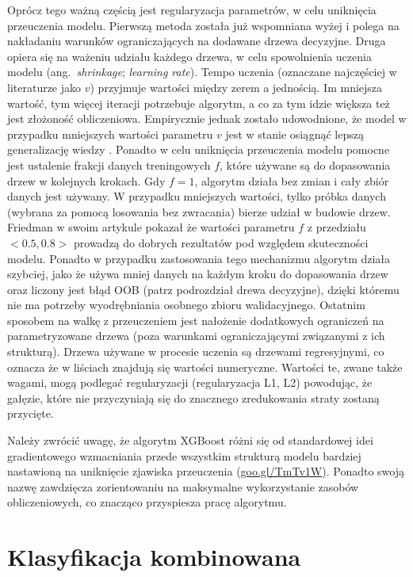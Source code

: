 \documentclass[12pt,a4paper,twoside,openany]{book}
\begin{document}
Oprócz tego ważną częścią jest regularyzacja parametrów, w celu uniknięcia przeuczenia modelu. Pierwszą metoda została już wspomniana wyżej i polega na nakładaniu warunków ograniczających na dodawane drzewa decyzyjne. Druga opiera się na ważeniu udziału każdego drzewa, w celu spowolnienia uczenia modelu (ang.~\textit{shrinkage}; \textit{learning rate}). Tempo uczenia (oznaczane najczęściej w literaturze jako $v$) przyjmuje wartości między zerem a jednością. Im mniejsza wartość, tym więcej iteracji potrzebuje algorytm, a co za tym idzie większa też jest złożoność obliczeniowa. Empirycznie jednak zostało udowodnione, że model w przypadku mniejszych wartości parametru $v$ jest w stanie osiągnąć lepszą generalizację wiedzy \citep{hastie2009}. Ponadto w celu uniknięcia przeuczenia modelu pomocne jest ustalenie frakcji danych treningowych $f$, które używane są do dopasowania drzew w kolejnych krokach. Gdy $f = 1$, algorytm działa bez zmian i cały zbiór danych jest używany. W przypadku mniejszych wartości, tylko próbka danych (wybrana za pomocą losowania bez zwracania) bierze udział w budowie drzew. Friedman w swoim artykule \citep{friedman1999} pokazał że wartości parametru $f$ z przedziału $<0.5, 0.8>$ prowadzą do dobrych rezultatów pod względem skuteczności modelu. Ponadto w przypadku zastosowania tego mechanizmu algorytm działa szybciej, jako że używa mniej danych na każdym kroku do dopasowania drzew oraz liczony jest błąd OOB (patrz podrozdział drewa decyzyjne), dzięki któremu nie ma potrzeby wyodrębniania osobnego zbioru walidacyjnego. Ostatnim sposobem na walkę z przeuczeniem jest nałożenie dodatkowych ograniczeń na parametryzowane drzewa (poza warunkami ograniczającymi związanymi z ich strukturą). Drzewa używane w procesie uczenia są drzewami regresyjnymi, co oznacza że w liściach znajdują się wartości numeryczne. Wartości te, zwane także wagami, mogą podlegać regularyzacji (regularyzacja L1, L2) powodując, że gałęzie, które nie przyczyniają się do znacznego zredukowania straty zostaną przycięte.

Należy zwrócić uwagę, że algorytm XGBoost różni się od standardowej idei gradientowego wzmacniania przede wszystkim strukturą modelu bardziej nastawioną na uniknięcie zjawiska przeuczenia (\url{goo.gl/TmTv1W}). Ponadto swoją nazwę zawdzięcza zorientowaniu na maksymalne wykorzystanie zasobów obliczeniowych, co znacząco przyspiesza pracę algorytmu. 


\chapter{Klasyfikacja kombinowana}
\end{document}
